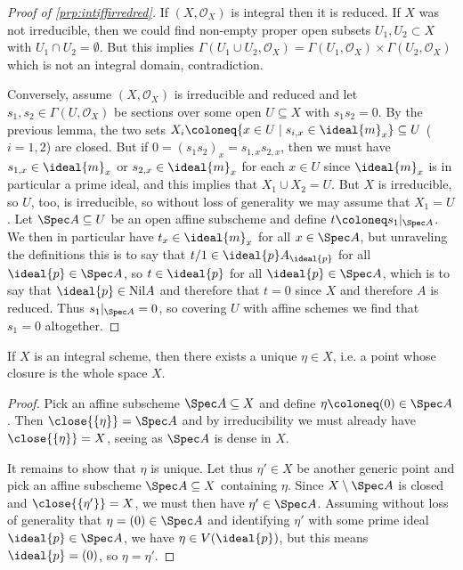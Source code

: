 \documentclass[wip, algebra]{bsteffan-lecturenotes}
\newcommand{\cO}{\mathcal{O}}
\newcommand{\Nil}{\mathrm{Nil}}
\begin{document}
\begin{proof}[Proof of \cref{prp:intiffirredred}]
	If $(X, \cO_X)$ is integral then it is reduced.
	If $X$ was not irreducible, then we could find non-empty proper open subsets $U_1, U_2 \subset X$ with $U_1 \cap U_2 = \emptyset$.
	But this implies $\Gamma(U_1 \cup U_2, \cO_X) = \Gamma(U_1, \cO_X) \times \Gamma(U_2, \cO_X)$ which is not an integral domain, contradiction.

	Conversely, assume $(X, \cO_X)$ is irreducible and reduced and let $s_1, s_2 \in \Gamma(U, \cO_X)$ be sections over some open $U \subseteq X$ with $s_1 s_2 = 0$.
	By the previous lemma, the two sets $X_i \coloneq \{x \in U \mid s_{i, x} \in \ideal{m}_x\}	\subseteq U$ ($i = 1, 2$) are closed.
	But if $0 = (s_1 s_2)_x = s_{1, x} s_{2, x}$, then we must have $s_{1, x} \in \ideal{m}_x$ or $s_{2, x} \in \ideal{m}_x$ for each $x \in U$ since $\ideal{m}_x$ is in particular a prime ideal, and this implies that $X_1 \cup X_2 = U$.
	But $X$ is irreducible, so $U$, too, is irreducible, so without loss of generality we may assume that $X_1 = U$.
	Let $\Spec A \subseteq U$ be an open affine subscheme and define $t\coloneq s_1|_{\Spec A}$.
	We then in particular have $t_x \in \ideal{m}_x$ for all $x \in \Spec A$, but unraveling the definitions this is to say that $t / 1 \in \ideal{p} A_{\ideal{p}}$ for all $\ideal{p} \in \Spec A$, so $t \in \ideal{p}$ for all $\ideal{p} \in \Spec A$, which is to say that $\ideal{p} \in \Nil A$ and therefore that $t = 0$ since $X$ and therefore $A$ is reduced.
	Thus $s_1|_{\Spec A} = 0$, so covering $U$ with affine schemes we find that $s_1 = 0$ altogether.
\end{proof}
\begin{corollary}
	If $X$ is an integral scheme, then there exists a unique  $\eta \in X$, i.e. a point whose closure is the whole space $X$.
\end{corollary}
\begin{proof}
	Pick an affine subscheme $\Spec A \subseteq X$ and define $\eta \coloneq (0) \in \Spec A$.
	Then $\close{\{\eta\}} = \Spec A$ and by irreducibility we must already have $\close{\{\eta\}} = X$, seeing as $\Spec A$ is dense in $X$.

	It remains to show that $\eta$ is unique.
	Let thus $\eta' \in X$ be another generic point and pick an affine subscheme $\Spec A \subseteq X$ containing $\eta$.
	Since $X \setminus \Spec A$ is closed and $\close{\{\eta'\}} = X$, we must then have $\eta' \in \Spec A$.
	Assuming without loss of generality that $\eta = (0) \in \Spec A$ and identifying $\eta'$ with some prime ideal $\ideal{p} \in \Spec A$, we have $\eta \in V(\ideal{p})$, but this means $\ideal{p} = (0)$, so $\eta = \eta'$.
\end{proof}
\end{document}
